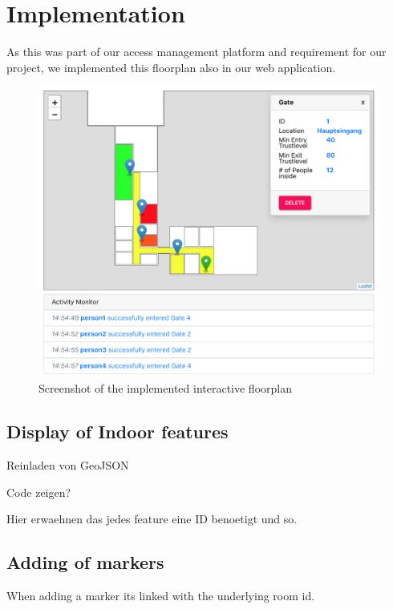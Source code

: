\section{Implementation}
As this was part of our access management platform and requirement for our project, we implemented this floorplan also in our web application.

\begin{figure}[!hb]
	\centering
	\includegraphics[width=0.9\linewidth]{images/FloorplanScreenshot}
	\caption{Screenshot of the implemented interactive floorplan}
	\label{fig:FloorplanScreenshot}
\end{figure}

\subsection{Display of Indoor features}
\label{Display of Indoor features}

Reinladen von GeoJSON

Code zeigen?

Hier erwaehnen das jedes feature eine ID benoetigt und so.

\subsection{Adding of markers}
\label{Adding of markers}

When adding a marker its linked with the underlying room id.

